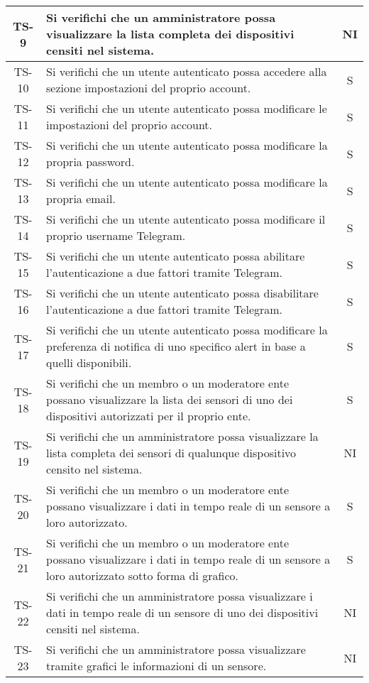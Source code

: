 \begin{center}
\begin{longtable}{|c|p{10cm}|c|}
			 \hline
			 TS-9 & Si verifichi che un amministratore possa visualizzare la lista completa dei dispositivi censiti nel sistema. & NI \\
			 \hline
			 TS-10 & Si verifichi che un utente autenticato possa accedere alla sezione impostazioni del proprio account. & S \\
			 \hline
			 TS-11 & Si verifichi che un utente autenticato possa modificare le impostazioni del proprio account. & S \\
			 \hline
			 TS-12 & Si verifichi che un utente autenticato possa modificare la propria password. & S \\
			 \hline
			 TS-13 & Si verifichi che un utente autenticato possa modificare la propria email. & S \\
			 \hline
			 TS-14 & Si verifichi che un utente autenticato possa modificare il proprio username Telegram. & S \\
			 \hline
			 TS-15 & Si verifichi che un utente autenticato possa abilitare l'autenticazione a due fattori tramite Telegram. & S \\
			 \hline
			 TS-16 & Si verifichi che un utente autenticato possa disabilitare l'autenticazione a due fattori tramite Telegram. & S \\
			 \hline
			 TS-17 & Si verifichi che un utente autenticato possa modificare la preferenza di notifica di uno specifico alert in base a quelli disponibili. & S \\
			 \hline
			 TS-18 & Si verifichi che un membro o un moderatore ente possano visualizzare la lista dei sensori di uno dei dispositivi autorizzati per il proprio ente. & S \\
			 \hline
			 TS-19 & Si verifichi che un amministratore possa visualizzare la lista completa dei sensori di qualunque dispositivo censito nel sistema. & NI \\
			 \hline
			 TS-20 & Si verifichi che un membro o un moderatore ente possano visualizzare i dati in tempo reale di un sensore a loro autorizzato. & S \\
			 \hline
			 TS-21 & Si verifichi che un membro o un moderatore ente possano visualizzare i dati in tempo reale di un sensore a loro autorizzato sotto forma di grafico. & S \\
			 \hline
			 TS-22 & Si verifichi che un amministratore possa visualizzare i dati in tempo reale di un sensore di uno dei dispositivi censiti nel sistema. & NI \\
			 \hline
			 TS-23 & Si verifichi che un amministratore possa visualizzare tramite grafici le informazioni di un sensore. & NI \\

\end{longtable}
\end{center}
